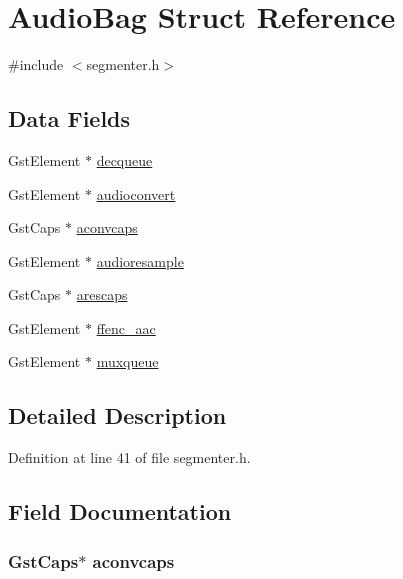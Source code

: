 \hypertarget{struct_audio_bag}{\section{\-Audio\-Bag \-Struct \-Reference}
\label{struct_audio_bag}
}


{\ttfamily \#include $<$segmenter.\-h$>$}

\subsection*{\-Data \-Fields}
\begin{DoxyCompactItemize}
\item 
\-Gst\-Element $\ast$ \hyperlink{struct_audio_bag_a60c8bc4118567d2ebc6ae53bca576f93}{decqueue}
\item 
\-Gst\-Element $\ast$ \hyperlink{struct_audio_bag_a5c648b7312b292946b43b94d35c5aeef}{audioconvert}
\item 
\-Gst\-Caps $\ast$ \hyperlink{struct_audio_bag_a4f83aa4e27ccfef61e6c94972bf22a02}{aconvcaps}
\item 
\-Gst\-Element $\ast$ \hyperlink{struct_audio_bag_ab3ae963e4ecb268062c0408e1046603f}{audioresample}
\item 
\-Gst\-Caps $\ast$ \hyperlink{struct_audio_bag_a740ee81301820a0ab68d91c9f96a9f75}{arescaps}
\item 
\-Gst\-Element $\ast$ \hyperlink{struct_audio_bag_a424c95ed83262d5926c84a1ac8698a8a}{ffenc\-\_\-aac}
\item 
\-Gst\-Element $\ast$ \hyperlink{struct_audio_bag_a917a2aa09433aafbcda72454d53c196f}{muxqueue}
\end{DoxyCompactItemize}


\subsection{\-Detailed \-Description}


\-Definition at line 41 of file segmenter.\-h.



\subsection{\-Field \-Documentation}
\hypertarget{struct_audio_bag_a4f83aa4e27ccfef61e6c94972bf22a02}{
\subsubsection[{aconvcaps}]{\setlength{\rightskip}{0pt plus 5cm}\-Gst\-Caps$\ast$ {\bf aconvcaps}}}\label{struct_audio_bag_a4f83aa4e27ccfef61e6c94972bf22a02}


